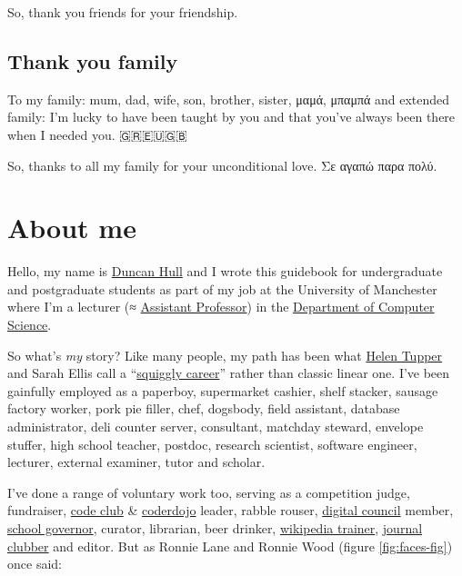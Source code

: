 \documentclass[
]{book}
\begin{document}
So, thank you friends for your friendship. 🙏

\hypertarget{family}{%
\subsection{Thank you family}\label{family}}

To my family: mum, dad, wife, son, brother, sister, μαμά, μπαμπά and extended family: I'm lucky to have been taught by you and that you've always been there when I needed you. 🇬🇷🇪🇺🇬🇧

So, thanks to all my family for your unconditional love. Σε αγαπώ παρα πολύ. 🙏

\hypertarget{duncan}{%
\section{About me}\label{duncan}}

Hello, my name is \href{http://www.cs.man.ac.uk/~hulld/}{Duncan Hull} and I wrote this guidebook for undergraduate and postgraduate students as part of my job at the University of Manchester where I'm a lecturer (≈ \href{https://en.wikipedia.org/wiki/Assistant_professor}{Assistant Professor}) in the \href{https://www.cs.manchester.ac.uk/}{Department of Computer Science}.

So what's \emph{my} story? Like many people, my path has been what \href{https://twitter.com/HelenTupper}{Helen Tupper} and Sarah Ellis call a ``\href{https://www.amazingif.com/}{squiggly career}'' rather than classic linear one. \citep{squigglybook, squigglytalk} I've been gainfully employed as a paperboy, supermarket cashier, shelf stacker, sausage factory worker, pork pie filler, chef, dogsbody, field assistant, database administrator, deli counter server, consultant, matchday steward, envelope stuffer, high school teacher, postdoc, research scientist, software engineer, lecturer, external examiner, tutor and scholar.

I've done a range of voluntary work too, serving as a competition judge, fundraiser, \href{https://codeclub.org}{code club} \& \href{https://coderdojo.com}{coderdojo} leader, rabble rouser, \href{https://www.manchesterdigital.com/}{digital council} member, \href{https://governorsforschools.org.uk/}{school governor}, curator, librarian, beer drinker, \href{https://wiki-loves-scientists.org.uk/}{wikipedia trainer}, \href{https://sigcse.cs.manchester.ac.uk/}{journal clubber} and editor. But as Ronnie Lane and Ronnie Wood (figure \ref{fig:faces-fig}) once said:
\end{document}
